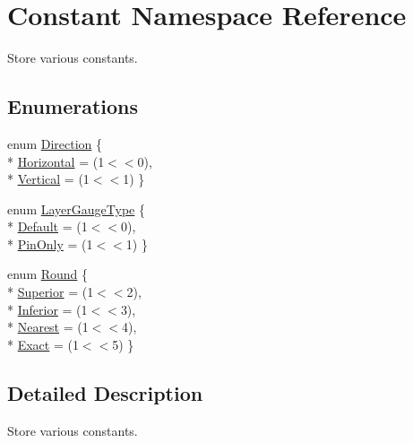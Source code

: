 \hypertarget{namespaceConstant}{\section{Constant Namespace Reference}
\label{namespaceConstant}
}


Store various constants.  


\subsection*{Enumerations}
\begin{DoxyCompactItemize}
\item 
enum \hyperlink{namespaceConstant_ac081a99f2b64361919ed5d9f37c0f9af}{Direction} \{ \\*
\hyperlink{namespaceConstant_ac081a99f2b64361919ed5d9f37c0f9afa7a545ff2d744fe30bfac294dfe9d03db}{Horizontal} = (1$<$$<$0), 
\\*
\hyperlink{namespaceConstant_ac081a99f2b64361919ed5d9f37c0f9afa63ce9cc57c99cccca96aa1157113da34}{Vertical} = (1$<$$<$1)
 \}
\item 
enum \hyperlink{namespaceConstant_ab2e46a17cc373a268c5c24fa0e2067e5}{Layer\-Gauge\-Type} \{ \\*
\hyperlink{namespaceConstant_ab2e46a17cc373a268c5c24fa0e2067e5ac83c789478a5dfedee2496415c62c1fb}{Default} = (1$<$$<$0), 
\\*
\hyperlink{namespaceConstant_ab2e46a17cc373a268c5c24fa0e2067e5a816e7f6e3fb44de0c2da893f32a6748e}{Pin\-Only} = (1$<$$<$1)
 \}
\item 
enum \hyperlink{namespaceConstant_abb6258ce09861f20cfe37b49d9a3515f}{Round} \{ \\*
\hyperlink{namespaceConstant_abb6258ce09861f20cfe37b49d9a3515faaf5371ebaadbfde8cd93c7e56aecb3c2}{Superior} = (1$<$$<$2), 
\\*
\hyperlink{namespaceConstant_abb6258ce09861f20cfe37b49d9a3515fa1140f16a605cb6cc263e206dcc2c90c9}{Inferior} = (1$<$$<$3), 
\\*
\hyperlink{namespaceConstant_abb6258ce09861f20cfe37b49d9a3515fac3c18902fbd4fbc14431d14904b35d61}{Nearest} = (1$<$$<$4), 
\\*
\hyperlink{namespaceConstant_abb6258ce09861f20cfe37b49d9a3515fa8c19f155f88d2db98534c1aec454862d}{Exact} = (1$<$$<$5)
 \}
\end{DoxyCompactItemize}


\subsection{Detailed Description}
Store various constants. 

